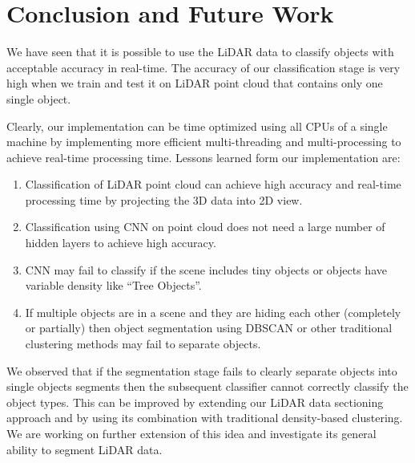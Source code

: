 \section{Conclusion and Future Work}\label{sec:conclusion}
We have seen that it is possible to use the LiDAR data to classify objects with acceptable accuracy in real-time.
The accuracy of our classification stage is very high when we train and test it on LiDAR point cloud that contains only one single object.


Clearly, our implementation can be time optimized using all CPUs of a single machine by implementing more efficient multi-threading 
and multi-processing to achieve real-time processing time.  Lessons learned form our implementation are:
\begin{enumerate}
  \item Classification of LiDAR point cloud can achieve high accuracy and real-time processing time by projecting the 3D data into 2D view.
  \item Classification using CNN on point cloud does not need a large number of hidden layers to achieve high accuracy.
  \item CNN may fail to classify if the scene includes tiny objects or objects have variable density like ``Tree Objects''.
  \item If multiple objects are in a scene and they are hiding each other (completely or partially) then object segmentation using DBSCAN 
  or other traditional clustering methods may fail to separate objects.
\end{enumerate}

We observed that if the segmentation stage fails to clearly separate objects into single objects segments then the subsequent 
classifier cannot correctly classify the object types. This can be improved by extending our LiDAR data sectioning approach and by 
using its combination with traditional density-based clustering. We are working on further extension of this idea and investigate its general 
ability to segment LiDAR data.  
